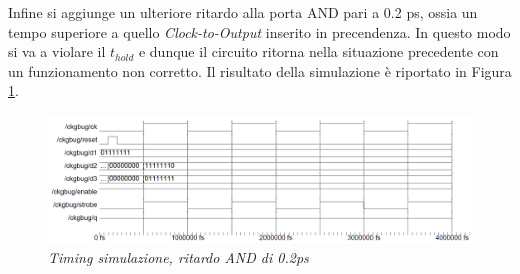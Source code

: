 \noindent Infine si aggiunge un ulteriore ritardo alla porta AND pari a 0.2 ps, ossia un tempo superiore a quello \textit{Clock-to-Output} inserito in precendenza. In questo modo si va a violare il $t_{hold}$ e dunque il circuito ritorna nella situazione precedente con un funzionamento non corretto. Il risultato della simulazione è riportato in Figura \ref{clock_gat3}. \\
\begin{figure}[!htb]
	\centering
	\includegraphics[scale=0.6]{immagini/clock_gating3}
	\caption{\textit{Timing simulazione, ritardo AND di 0.2ps}}
	\label{clock_gat3}
\end{figure}
\newpage
